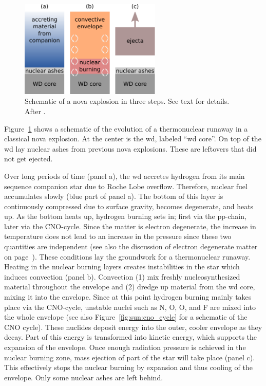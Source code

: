 \begin{figure}[tb]
    \centering
    \includegraphics[width=0.6\textwidth]{graphics/novae/nova_schematic}
    \caption{Schematic of a nova explosion in three steps. See text for details. After \citet{iliadis18}.}
    \label{fig:novae:schematic_of_thermonuclear_runaway}
\end{figure}
Figure~\ref{fig:novae:schematic_of_thermonuclear_runaway} shows a schematic of the evolution of a thermonuclear runaway in a classical nova explosion. At the center is the \ac{wd}, labeled ``\ac{wd} core''. On top of the \ac{wd} lay nuclear ashes from previous nova explosions. These are leftovers that did not get ejected.

Over long periods of time (panel a), the \ac{wd} accretes hydrogen from its main sequence companion star due to Roche Lobe overflow. Therefore, nuclear fuel accumulates slowly (blue part of panel a). The bottom of this layer is continuously compressed due to surface gravity, becomes degenerate, and heats up. As the bottom heats up, hydrogen burning sets in; first via the \ac{pp-chain}, later via the CNO-cycle. Since the matter is electron degenerate, the increase in temperature does not lead to an increase in the pressure since these two quantities are independent (see also the discussion of electron degenerate matter on page~\pageref{box:sun:electron_degenerate_matter}). These conditions lay the groundwork for a thermonuclear runaway. Heating in the nuclear burning layers creates instabilities in the star which induces convection (panel b). Convection (1) mix freshly nucleosynthesized material throughout the envelope and (2) dredge up material from the \ac{wd} core, mixing it into the envelope. Since at this point hydrogen burning mainly takes place via the CNO-cycle, unstable nuclei such as N, O, O, and F are mixed into the whole envelope (see also Figure~\ref{fig:sun:cno_cycle} for a schematic of the CNO cycle). These nuclides deposit energy into the outer, cooler envelope as they decay. Part of this energy is transformed into kinetic energy, which supports the expansion of the envelope. Once enough radiation pressure is achieved in the nuclear burning zone, mass ejection of part of the star will take place (panel c). This effectively stops the nuclear burning by expansion and thus cooling of the envelope. Only some nuclear ashes are left behind. 

